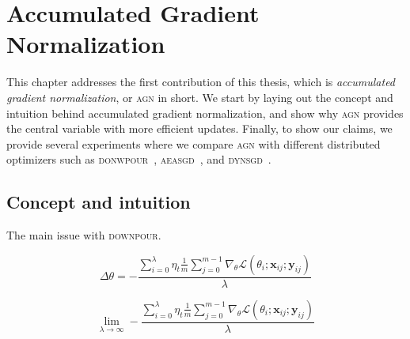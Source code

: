 %
%
%

\chapter{Accumulated Gradient Normalization}
\label{chapter:accumulated_gradient_normalization}

This chapter addresses the first contribution of this thesis, which is \emph{accumulated gradient normalization}, or \textsc{agn} in short. We start by laying out the concept and intuition behind accumulated gradient normalization, and show why \textsc{agn} provides the central variable with more efficient updates. Finally, to show our claims, we provide several experiments where we compare \textsc{agn} with different distributed optimizers such as \textsc{donwpour}~\cite{dean2012large}, \textsc{aeasgd}~\cite{zhang2015deep}, and \textsc{dynsgd}~\cite{jiang2017heterogeneity}.

\section{Concept and intuition}
\label{sec:agn_concept}

The main issue with \textsc{downpour}.

\begin{equation}
  \label{eq:accumulated_gradient_normalization}
  \Delta\theta = -\frac{\sum_{i = 0}^\lambda \eta_t \frac{1}{m}\sum_{j = 0}^{m - 1} \nabla_\theta \mathcal{L}(\theta_i;\textbf{x}_{ij};\textbf{y}_{ij})}{\lambda}
\end{equation}

\begin{equation}
  \lim_{\lambda \to \infty} -\frac{\sum_{i = 0}^\lambda \eta_t \frac{1}{m}\sum_{j = 0}^{m - 1} \nabla_\theta \mathcal{L}(\theta_i;\textbf{x}_{ij};\textbf{y}_{ij})}{\lambda}
\end{equation}

